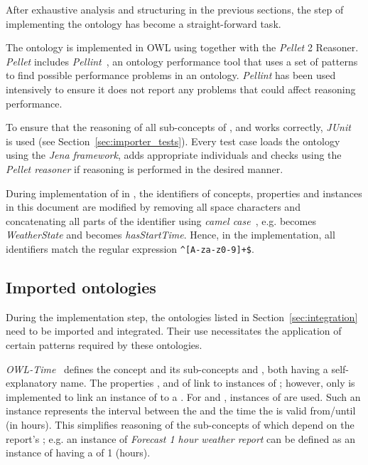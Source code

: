 
After exhaustive analysis and structuring in the previous sections, the step of implementing the ontology has become a straight-forward task.

The \smarthomeweather ontology is implemented in OWL using  together with the \emph{Pellet}  2 Reasoner. \emph{Pellet} includes \emph{Pellint}~\cite{pellint}, an ontology performance tool that uses a set of patterns to find possible performance problems in an  ontology. \emph{Pellint} has been used intensively to ensure it does not report any problems that could affect reasoning performance.

To ensure that the reasoning of all sub-concepts of ,  and  works correctly, \emph{JUnit}~\cite{junit} is used (see Section~\ref{sec:importer_tests}). Every test case loads the \smarthomeweather ontology using the \emph{Jena framework}, adds appropriate individuals and checks using the \emph{Pellet reasoner} if reasoning is performed in the desired manner.

During implementation of \smarthomeweather in , the identifiers of concepts, properties and instances in this document are modified by removing all space characters and concatenating all parts of the identifier using \emph{camel case}~\cite{CamelCase}, e.g.  becomes \emph{WeatherState} and  becomes \emph{hasStartTime}. Hence, in the  implementation, all identifiers match the regular expression \texttt{\textasciicircum[A-za-z0-9]+\$}.

\subsection{Imported ontologies}
\label{sec:ontology_imports}

During the implementation step, the ontologies listed in Section~\ref{sec:integration} need to be imported and integrated. Their use necessitates the application of certain patterns required by these ontologies.

\vspace{1em}

\emph{OWL-Time}~\cite{owl-time} defines the concept  and its sub-concepts  and , both having a self-explanatory name. The properties ,  and  of  link to instances of ; however, only  is implemented to link an instance of  to a . For  and , instances of  are used. Such an instance represents the interval between the  and the time the  is valid from/until (in hours). This simplifies reasoning of the sub-concepts of  which depend on the report's ; e.g. an instance of \emph{Forecast 1 hour weather report} can be defined as an instance of  having a  of \num{1} (hours).

